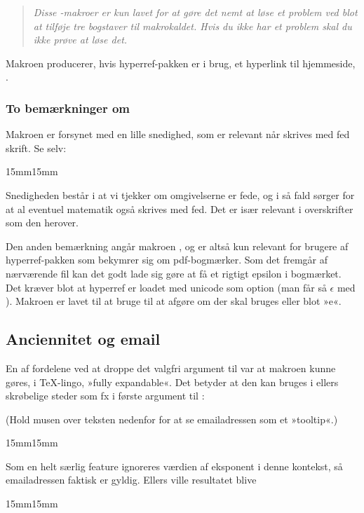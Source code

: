 \documentclass[a4paper,article,oneside,danish]{memoir}
\newcommand{\pakkenavn}[1]{\textsf{#1}}
\newcommand*{\optionname}[1]{\textcolor{option}{#1}}
\newenvironment{resultat}{%
  \begin{adjustwidth}{15mm}{15mm}%
    \begin{qshade}%
    }{%
    \end{qshade}%
  \end{adjustwidth}}
\begin{document}
\begin{quote}
  \itshape  Disse -makroer er kun lavet for at gøre det nemt at løse
  et problem ved blot at tilføje tre bogstaver til makrokaldet. Hvis
  du ikke har et problem skal du ikke prøve at løse det.
\end{quote}

Makroen  producerer, hvis \pakkenavn{hyperref}-pakken er i
brug, et hyperlink til \TKETs hjemmeside, \TKurl.

\subsubsection{To bemærkninger om \RemToRpdf}
\label{sec:bemarkn-om-remt}

Makroen  er forsynet med en lille snedighed, som er
relevant når \RemToR skrives med fed skrift. Se selv:


\begin{resultat}

\end{resultat}

Snedigheden består i at vi tjekker om omgivelserne er fede, og i så
fald sørger for at al eventuel matematik også skrives med fed. Det er
især relevant i overskrifter som den herover.

Den anden bemærkning angår makroen , og er altså kun
relevant for brugere af \pakkenavn{hyperref}-pakken som bekymrer sig
om pdf-bogmærker. Som det fremgår af nærværende fil kan det godt lade
sig gøre at få et rigtigt epsilon i bogmærket. Det kræver blot at
\pakkenavn{hyperref} er loadet med \optionname{unicode} som option
(man får så $\epsilon$ med ). Makroen 
er lavet til at bruge  til at afgøre om der skal
bruges  eller blot »e«.

\subsection{Anciennitet og email}
\label{sec:anciennitet-og-email}

En af fordelene ved at droppe det valgfri argument til 
var at makroen kunne gøres, i \TeX-lingo, »fully expandable«. Det
betyder at den kan bruges i ellers skrøbelige steder som fx i første
argument til :

(Hold musen over teksten nedenfor for at se emailadressen som et »tooltip«.)
\begin{resultat}

\end{resultat}
Som en helt særlig feature ignoreres værdien af \optionname{eksponent}
i denne kontekst, så emailadressen faktisk er gyldig. Ellers ville
resultatet blive
\begin{resultat}

\end{resultat}
\end{document}
